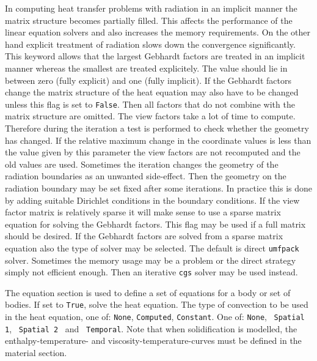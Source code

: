%
In computing heat transfer problems with radiation in an implicit manner the matrix structure 
becomes partially filled. This affects the performance of the linear equation solvers
and also increases the memory requirements. On the other hand explicit treatment 
of radiation slows down the convergence significantly. This keyword allows
that the largest Gebhardt factors are treated in an implicit manner whereas
the smallest are treated explicitely. The value should lie in between 
zero (fully explicit) and one (fully implicit).
%
If the Gebhardt factors change the matrix structure of the heat equation
may also have to be changed unless this flag is set to \texttt{False}.
Then all factors that do not combine with the matrix structure are omitted.
The view factors take a lot of time to compute. Therefore during the iteration a test is performed 
to check whether the geometry has changed. If the relative maximum change in the coordinate 
values is less than the value given by this parameter the view factors are not recomputed and
the old values are used. 
Sometimes the iteration changes the geometry of the radiation
boundaries as an unwanted side-effect. Then the geometry on the radiation 
boundary may be set fixed after some iterations. In practice this is done by adding
suitable Dirichlet conditions in the boundary conditions.
If the view factor matrix is relatively sparse it will make sense
to use a sparse matrix equation for solving the Gebhardt factors.
This flag may be used if a full matrix should be desired.
If the Gebhardt factors are solved from a sparse matrix equation 
also the type of solver may be selected. The default is 
direct \texttt{umfpack} solver. Sometimes the memory usage may be a problem
or the direct strategy simply not efficient enough. Then 
an iterative \texttt{cgs} solver may be used instead.
\sifend

The equation section is used to define a set of equations for a body or set of bodies.
\sifbegin
{} If set to {\tt True}, solve the heat equation.
The type of convection to be used
in the heat equation, one of: {\tt None}, {\tt Computed}, {\tt Constant}.
One of: {\tt None},~ {\tt Spatial 1},
~{\tt Spatial 2}~ and~ {\tt Temporal}.
Note that when solidification is modelled, the
enthalpy-temperature- and viscosity-temperature-curves must be defined in 
the material section.
\sifend



